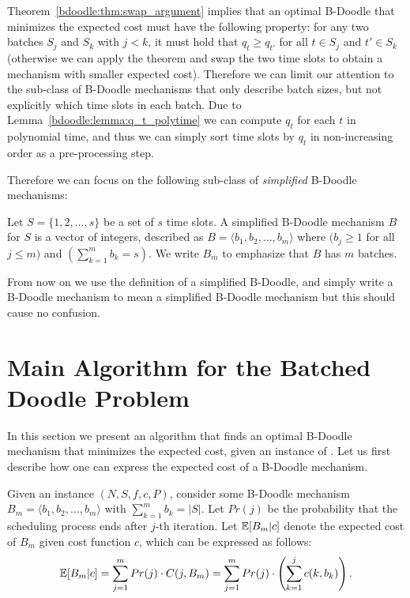Theorem~\ref{bdoodle:thm:swap_argument} implies that an optimal B-Doodle that minimizes the expected cost must have the following property: for any two batches $S_j$ and $S_k$ with $j < k$, it must hold that $q_t \geq q_{t'}$ for all $t\in S_j$ and $t' \in S_k$ (otherwise we can apply the theorem and swap the two time slots to obtain a mechanism with smaller expected cost).
Therefore we can limit our attention to the sub-class of B-Doodle mechanisms that only describe batch sizes, but not explicitly which time slots in each batch. Due to Lemma~\ref{bdoodle:lemma:q_t_polytime} we can compute $q_t$ for each $t$ in polynomial time, and thus we can simply sort time slots by $q_t$ in non-increasing order as a pre-processing step.

Therefore we can focus on the following sub-class of \emph{simplified} B-Doodle mechanisms:
\begin{definition}
Let $S = \{1, 2, \dots, s\}$ be a set of $s$ time slots. 
A simplified B-Doodle mechanism $B$ for $S$ is a vector of integers, described as $B = \langle b_1, b_2, \dots, b_m\rangle$ where $(b_j \geq 1$ for all $j \leq m)$ and $(\sum_{k=1}^{m} b_k = s)$.
We write $B_m$ to emphasize that $B$ has $m$ batches.
\end{definition}
From now on we use the definition of a simplified B-Doodle, and simply write a B-Doodle mechanism to mean a simplified B-Doodle mechanism but this should cause no confusion.






\section{Main Algorithm for the Batched Doodle Problem} \label{bdoodle:sec:Algorithm}

In this section we present an algorithm that finds an optimal B-Doodle mechanism that minimizes the expected cost, given an instance of \BDP. Let us first describe how one can express the expected cost of a B-Doodle mechanism. 

Given an instance $(N, S, f, c, P)$, consider some B-Doodle mechanism $B_{m} = \langle b_1, b_2, \dots, b_m \rangle$ with $\sum_{k=1}^{m} b_k = |S|$. Let $Pr(j)$ be the probability that the scheduling process ends after $j$-th iteration. Let $\mathbb{E}[B_{m} | c]$ denote the expected cost of $B_{m}$ given cost function $c$, which can be expressed as follows:
\begin{equation} \label{bdoodle:eqn:expCost}
	\mathbb{E}[B_{m} | c] = \sum_{j=1}^{m} Pr(j) \cdot C(j, B_{m})  =  \sum_{j=1}^{m} Pr(j) \cdot \left(\sum_{k=1}^{j} c(k, b_k)\right).
\end{equation}%

